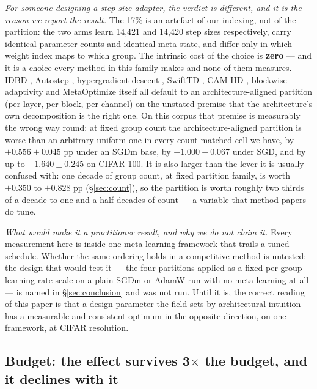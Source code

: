\documentclass[10pt,letterpaper]{article}
\begin{document}
\emph{For someone designing a step-size adapter, the verdict is different, and it is the reason we
report the result.} The 17\% is an artefact of our indexing, not of the partition: the two arms
learn 14{,}421 and 14{,}420 step sizes respectively, carry identical parameter counts and
identical meta-state, and differ only in which weight index maps to which group. The intrinsic
cost of the choice is \textbf{zero} --- and it is a choice every method in this family makes and
none of them measures. IDBD \citep{sutton1992idbd}, Autostep \citep{mahmood2012autostep},
hypergradient descent \citep{baydin2018hypergradient}, SwiftTD \citep{javed2024swifttd}, CAM-HD
\citep{jie2022camhd}, blockwise adaptivity \citep{zheng2019blockwise} and MetaOptimize
\citep{sharifnassab2025metaoptimize} itself all default to an architecture-aligned partition (per
layer, per block, per channel) on the unstated premise that the architecture's own decomposition
is the right one. On this corpus that premise is measurably the wrong way round: at fixed group
count the architecture-aligned partition is worse than an arbitrary uniform one in every
count-matched cell we have, by $+0.556 \pm 0.045$ pp under an SGDm base, by $+1.000 \pm 0.067$
under SGD, and by up to $+1.640 \pm 0.245$ on CIFAR-100. It is also larger than the lever it is
usually confused with: one decade of group count, at fixed partition family, is worth $+0.350$ to
$+0.828$ pp (\S\ref{sec:count}), so the partition is worth roughly two thirds of a decade to one
and a half decades of count --- a variable that method papers do tune.

\emph{What would make it a practitioner result, and why we do not claim it.} Every measurement
here is inside one meta-learning framework that trails a tuned schedule. Whether the same ordering
holds in a competitive method is untested: the design that would test it --- the four partitions
applied as a fixed per-group learning-rate scale on a plain SGDm or AdamW run with no
meta-learning at all --- is named in \S\ref{sec:conclusion} and was not run. Until it is, the
correct reading of this paper is that a design parameter the field sets by architectural intuition
has a measurable and consistent optimum in the opposite direction, on one framework, at CIFAR
resolution.

\subsection{Budget: the effect survives 3$\times$ the budget, and it declines with it}
\label{sec:budget}
\end{document}

